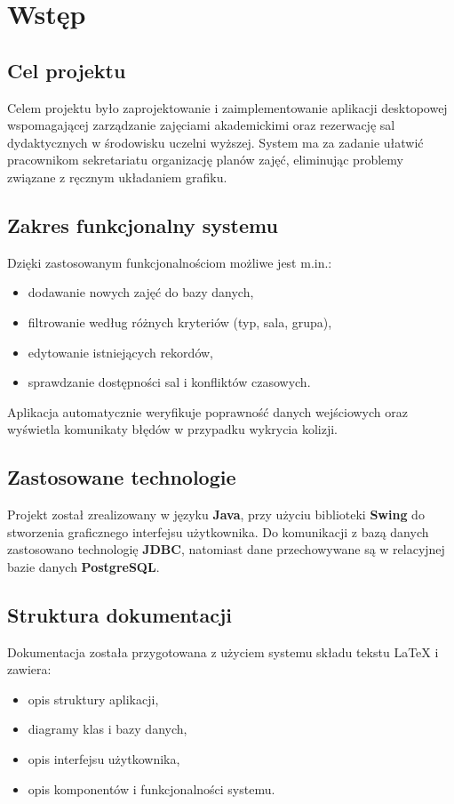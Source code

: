 \chapter{Wstęp}

\section{Cel projektu}

Celem projektu było zaprojektowanie i zaimplementowanie aplikacji desktopowej wspomagającej zarządzanie zajęciami akademickimi oraz rezerwację sal dydaktycznych w środowisku uczelni wyższej.  
System ma za zadanie ułatwić pracownikom sekretariatu organizację planów zajęć, eliminując problemy związane z ręcznym układaniem grafiku.

\section{Zakres funkcjonalny systemu}

Dzięki zastosowanym funkcjonalnościom możliwe jest m.in.:
\begin{itemize}
    \item dodawanie nowych zajęć do bazy danych,
    \item filtrowanie według różnych kryteriów (typ, sala, grupa),
    \item edytowanie istniejących rekordów,
    \item sprawdzanie dostępności sal i konfliktów czasowych.
\end{itemize}

Aplikacja automatycznie weryfikuje poprawność danych wejściowych oraz wyświetla komunikaty błędów w przypadku wykrycia kolizji.

\section{Zastosowane technologie}

Projekt został zrealizowany w języku \textbf{Java}, przy użyciu biblioteki \textbf{Swing} do stworzenia graficznego interfejsu użytkownika.  
Do komunikacji z bazą danych zastosowano technologię \textbf{JDBC}, natomiast dane przechowywane są w relacyjnej bazie danych \textbf{PostgreSQL}.

\section{Struktura dokumentacji}

Dokumentacja została przygotowana z użyciem systemu składu tekstu \LaTeX{} i zawiera:
\begin{itemize}
    \item opis struktury aplikacji,
    \item diagramy klas i bazy danych,
    \item opis interfejsu użytkownika,
    \item opis komponentów i funkcjonalności systemu.
\end{itemize}
